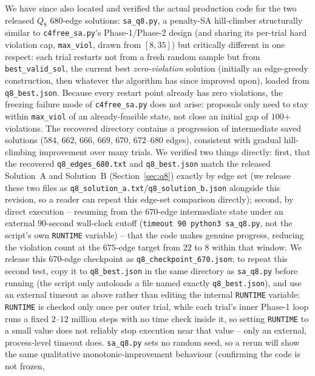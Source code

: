 \documentclass[12pt]{article}
\begin{document}
We have since also located and verified the actual
production code for the two released $Q_8$ $680$-edge solutions:
\texttt{sa\_q8.py}, a penalty-SA hill-climber structurally similar to
\texttt{c4free\_sa.py}'s Phase-1/Phase-2 design (and sharing its
per-trial hard violation cap, \texttt{max\_viol}, drawn from
$[8,35]$) but critically different in one respect: each trial
restarts not from a fresh random sample but from \texttt{best\_valid\_sol},
the current best \emph{zero-violation} solution (initially an
edge-greedy construction, then whatever the algorithm has since
improved upon), loaded from \texttt{q8\_best.json}. Because every
restart point already has zero violations, the freezing failure mode
of \texttt{c4free\_sa.py} does not arise: proposals only need to stay
within \texttt{max\_viol} of an already-feasible state, not close an
initial gap of $100$+ violations. The recovered directory contains a
progression of intermediate saved solutions ($584$, $662$, $666$,
$669$, $670$, $672$--$680$ edges), consistent with gradual
hill-climbing improvement over many trials.
We verified two things directly: first, that the recovered
\texttt{q8\_edges\_680.txt} and \texttt{q8\_best.json} match the
released Solution~A and Solution~B (Section~\ref{sec:q8}) exactly by
edge set (we release these two files as
\texttt{q8\_solution\_a.txt}/\texttt{q8\_solution\_b.json} alongside
this revision, so a reader can repeat this edge-set comparison
directly); second, by direct execution -- resuming from the $670$-edge
intermediate state under an external $90$-second wall-clock cutoff
(\texttt{timeout 90 python3 sa\_q8.py}, not the script's own
\texttt{RUNTIME} variable) -- that the code makes
genuine progress, reducing the violation count at the $675$-edge
target from $22$ to $8$ within that window. We release
this $670$-edge checkpoint as \texttt{q8\_checkpoint\_670.json}; to
repeat this second test, copy it to \texttt{q8\_best.json} in the
same directory as \texttt{sa\_q8.py} before running (the script only
autoloads a file named exactly \texttt{q8\_best.json}), and use an
external timeout as above rather than editing the internal
\texttt{RUNTIME} variable: \texttt{RUNTIME} is checked only once per
outer trial, while each trial's inner Phase-1 loop runs a fixed
$2$--$12$ million steps with no time check inside it, so setting
\texttt{RUNTIME} to a small value does not reliably stop execution
near that value -- only an external, process-level timeout does.
\texttt{sa\_q8.py} sets no random seed,
so a rerun will show the same qualitative
monotonic-improvement behaviour (confirming the code is not frozen,
\end{document}
